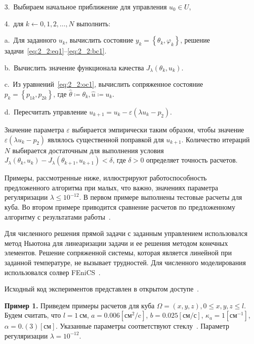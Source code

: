 3.\ Выбираем начальное приближение для управления $u_{0} \in U$,

4.\ для $k \leftarrow 0,1,2, \ldots, N$ выполнить:

\hspace{1cm} a.\ Для заданного $u_{k}$, вычислить состояние
$y_{k}=\left\{\theta_{k}, \varphi_{k}\right\}$, решение
задачи~\eqref{eq:2_2:eq1}--\eqref{eq:2_2:bc1}.

\hspace{1cm} b.\ Вычислить значение функционала качества
$J_{\lambda}\left(\theta_{k}, u_{k}\right)$.

\hspace{1cm} c.\ Из уравнений~\eqref{eq:2_2:oc1}, вычислить сопряженное
состояние $p_{k}=\left\{p_{1k}, p_{2k}\right\}$,
где $\widehat{\theta} \coloneqq \theta_{k}, \widehat{u} \coloneqq u_{k}$.

\hspace{1cm} d.\ Пересчитать управление
$u_{k+1}=u_{k}-\varepsilon\left(\lambda u_{k}-p_{2}\right)$.


Значение параметра $\varepsilon$ выбирается эмпирически таким образом, чтобы значение
$\varepsilon (\lambda u_k - p_2)$ являлось существенной поправкой для $u_{k+1}$.
Количество итераций $N$ выбирается достаточным для выполнения условия
$J_\lambda(\theta_k, u_k) - J_\lambda(\theta_{k+1}, u_{k+1}) < \delta$, где $\delta>0$
определяет точность расчетов.

Примеры, рассмотренные ниже, иллюстрируют работоспособность предложенного алгоритма при
малых, что важно, значениях параметра регуляризации $\lambda \leq 10^{-12}$.
В первом примере выполнены тестовые расчеты для куба.
Во втором примере приводится сравнение расчетов по
предложенному алгоритму с результатами работы~\cite{Chebotarev2019Problem}.

Для численного решения прямой задачи с заданным управлением использовался
метод Ньютона для линеаризации задачи и ее решения методом конечных элементов.
Решение сопряженной системы, которая является линейной при заданной температуре,
не вызывает трудностей.
Для численного моделирования использовался солвер FEniCS~\cite{fenics, dolfin}.

Исходный код экспериментов представлен в открытом доступе~\cite{mesenev-github}.

\textbf{Пример 1.}
Приведем примеры расчетов для куба $\Omega = {(x, y, z), 0 \leq x,y,z \leq l}$.
Будем считать, что $l=1~\text{см}$, $a = 0.006[\text{см}^2/\text{c}]$,
$b=0.025[\text{см}/\text{с}]$, $\kappa_a=1[\text{см}^{-1}]$, $\alpha = 0.(3)[\text{см}]$.
Указанные параметры соответствуют стеклу~\cite{Grenkin2016a}.
Параметр регуляризации $\lambda=10^{-12}$.

